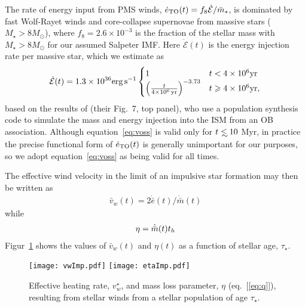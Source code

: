 The rate of energy input from PMS winds, $\dot{e}_{\rm TO}(t) = f_{8}\dot{\mathcal{E}}/\bar{m}_*$, is dominated by fast Wolf-Rayet winds and core-collapse supernovae from massive stars ($M_{\star} > 8M_{\odot}$), where $f_{8} =2.6 \times 10^{-3}$ is the fraction of the stellar mass with $M_{\star} > 8M_{\odot}$ for our assumed Salpeter IMF.  Here $\dot{\mathcal{E}} (t)$ is the energy injection rate per massive star, which we estimate as
\begin{align}
\dot{\mathcal{E}} (t)=  1.3 \times 10^{36} {\rm erg\,s^{-1}}
\begin{cases}
  1 & t<4 \times 10^6 {\rm yr}\\
  \left(\frac{t}{4 \times  10^6\,{\rm yr}}\right)^{-3.73} & t \ge 4 \times 10^6 {\rm yr},
\end{cases}
\label{eq:voss}
\end{align}
based on the results of \citet{VossDiehl+:2009a} (their Fig.~7, top panel), who use a population synthesis code to simulate the mass and energy injection into the ISM from an OB association.  Although equation~\eqref{eq:voss} is valid only for $t \lsim 10$ Myr, in practice the precise functional form of $\dot{e}_{\rm TO}(t)$ is generally unimportant for our purposes, so we adopt equation~\eqref{eq:voss} as being valid for all times.


The effective wind velocity in the limit of an impulsive star formation may then be written
as 
\begin{align}
\bar{v}_w(t)=2 \dot{\bar{e}}(t)/\dot{\bar{m}}(t)
\label{eq:vwImp}
\end{align}
while 
\begin{align}
\eta = \dot{\bar{m}}(t) \th
\label{eq:vwImp}
\end{align}
 Figur~\ref{fig:vwImp} shows the values of $\bar{v}_w(t)$ and $\eta(t)$ as a function of stellar age, $\tau_{\star}$.

\begin{figure}
\texttt{[image: vwImp.pdf]}
\texttt{[image: etaImp.pdf]}
\caption{\label{fig:vwImp} Effective heating rate, $v_w^{\star}$, and mass loss parameter, $\eta$ (eq.~[\ref{eq:q}]), resulting from stellar winds from a stellar population of age $\tau_{\star}$.}
\end{figure}



